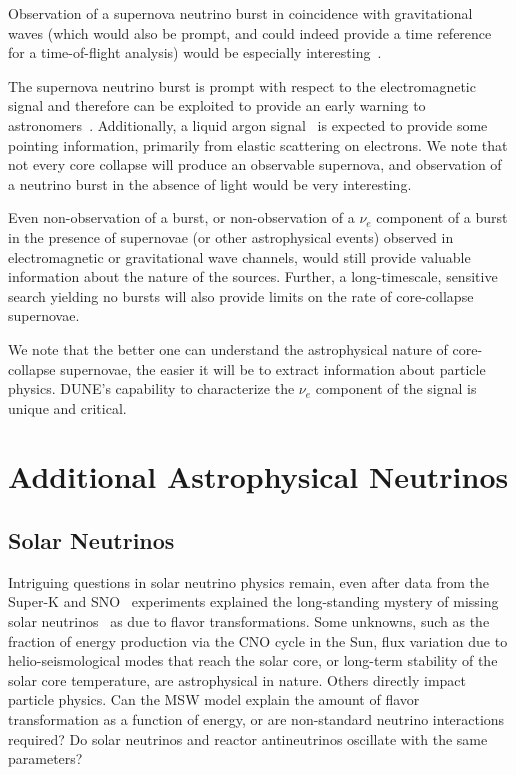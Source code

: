 Observation of a supernova neutrino burst in coincidence with gravitational waves (which would also be prompt, and could indeed provide a time reference for a time-of-flight analysis) would be especially interesting~\cite{Arnaud:2003zr,Ott:2012jq, Mueller:2012sv, Nishizawa:2014zna}.

The supernova neutrino burst is prompt with respect to the
electromagnetic signal and therefore can be exploited to provide an
early warning to astronomers~\cite{Antonioli:2004zb,Scholberg:2008fa}.  
Additionally, a liquid argon signal~\cite{Bueno:2003ei} is expected to
provide some pointing information, primarily from elastic scattering
on electrons.
We note that not every core collapse will produce an observable supernova, and observation of a neutrino burst in the absence of light would be very interesting. 

Even non-observation of a burst, or non-observation of
a $\nu_e$ component of a burst in the presence of supernovae (or other
astrophysical events) observed in electromagnetic or gravitational
wave channels, would still provide valuable information about the
nature of the sources.  Further, a long-timescale, sensitive search
yielding no bursts will also provide limits on the rate of
core-collapse supernovae.

We note that the better one can understand the astrophysical nature of core-collapse supernovae, the easier it will be to extract information about particle physics.  DUNE's capability to characterize the $\nu_e$ component of the signal is unique and critical.


\section{Additional Astrophysical Neutrinos}
\label{sec:physics-snblowe-other}

\subsection{Solar Neutrinos}

Intriguing questions in solar neutrino physics remain,
even after data
from the Super-K and SNO~\cite{Fukuda:2001nj,Ahmad:2001an}
experiments explained the long-standing mystery of missing solar
neutrinos~\cite{Cleveland:1998nv} as due to flavor
transformations. 
Some unknowns, such as the fraction of energy production via the CNO
cycle in the Sun, flux variation due to helio-seismological modes that
reach the solar core, or long-term stability of the solar core
temperature, are astrophysical in nature. Others directly impact
particle physics. Can the MSW model explain the amount of flavor
transformation as a function of energy, or are non-standard neutrino
interactions required?  Do solar neutrinos and reactor antineutrinos
oscillate with the same parameters? 

